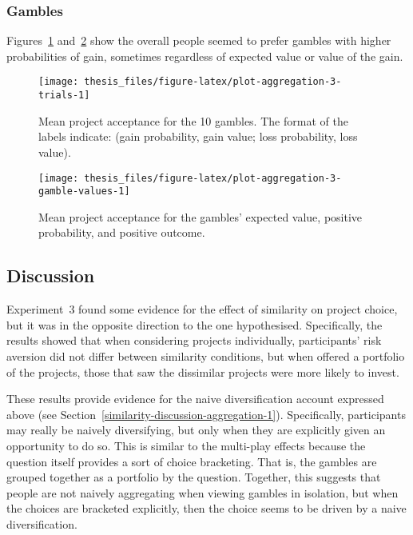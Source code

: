 \documentclass[a4paper, nobind]{templates/ociamthesis}
\theoremstyle{definition}
\theoremstyle{definition}
\theoremstyle{definition}
\theoremstyle{definition}
\theoremstyle{remark}
\begin{document}
\subsubsection{Gambles}

Figures~\ref{fig:plot-aggregation-3-trials}
and~\ref{fig:plot-aggregation-3-gamble-values} show the
overall people seemed to prefer gambles with higher probabilities of gain,
sometimes regardless of expected value or value of the gain.



\begin{figure}
\texttt{[image: thesis\_files/figure-latex/plot-aggregation-3-trials-1]} \caption{Mean project acceptance for the 10 gambles. The format of the labels indicate: (gain probability, gain value; loss probability, loss value).}\label{fig:plot-aggregation-3-trials}
\end{figure}




\begin{figure}
\texttt{[image: thesis\_files/figure-latex/plot-aggregation-3-gamble-values-1]} \caption{Mean project acceptance for the gambles'
expected value, positive probability, and positive outcome.}\label{fig:plot-aggregation-3-gamble-values}
\end{figure}

\subsection{Discussion}

Experiment~3 found some evidence for the effect of similarity on project choice,
but it was in the opposite direction to the one hypothesised. Specifically, the
results showed that when considering projects individually, participants' risk
aversion did not differ between similarity conditions, but when offered a
portfolio of the projects, those that saw the dissimilar projects were more
likely to invest.

These results provide evidence for the naive diversification account expressed
above (see Section~\ref{similarity-discussion-aggregation-1}). Specifically,
participants may really be naively diversifying, but only when they are
explicitly given an opportunity to do so. This is similar to the multi-play
effects because the question itself provides a sort of choice bracketing. That
is, the gambles are grouped together as a portfolio by the question. Together,
this suggests that people are not naively aggregating when viewing gambles in
isolation, but when the choices are bracketed explicitly, then the choice seems
to be driven by a naive diversification.
\end{document}
